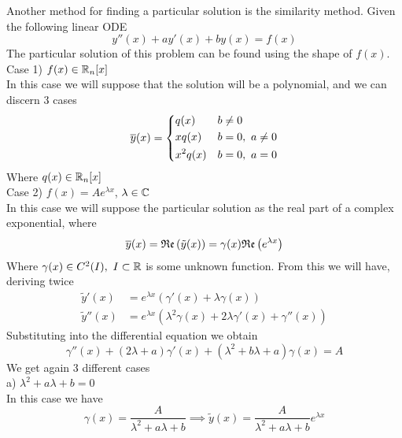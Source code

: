 \documentclass[../complete.tex]{subfiles}
\begin{document}
\begin{mtd}
	Another method for finding a particular solution is the similarity method. Given the following linear ODE
	\begin{equation*}
		y''(x)+ay'(x)+by(x)=f(x)
	\end{equation*}
	The particular solution of this problem can be found using the shape of $f(x)$.\\
	Case 1) $f(x)\in\mathbb{R}_n[x]$\\
	In this case we will suppose that the solution will be a polynomial, and we can discern 3 cases
	\begin{equation*}
		\overline{y}(x)=\begin{dcases}
			q(x)&b\ne0\\
			xq(x)&b=0,\ a\ne0\\
			x^2q(x)&b=0,\ a=0
		\end{dcases}
	\end{equation*}
	Where $q(x)\in\mathbb{R}_n[x]$\\
	Case 2) $f(x)=Ae^{\lambda x}$, $\lambda\in\mathbb{C}$\\
	In this case we will suppose the particular solution as the real part of a complex exponential, where
	\begin{equation*}
		\overline{y}(x)=\mathfrak{Re}\left( \tilde{y}(x) \right)=\gamma(x)\mathfrak{Re}\left( e^{\lambda x} \right)
	\end{equation*}
	Where $\gamma(x)\in C^2(I),\ I\subset\mathbb{R}$ is some unknown function. From this we will have, deriving twice
	\begin{equation*}
		\begin{aligned}
			\tilde{y}'(x)&=e^{\lambda x}\left( \gamma'(x)+\lambda\gamma(x) \right)\\
			\tilde{y}''(x)&=e^{\lambda x}\left( \lambda^2\gamma(x)+2\lambda\gamma'(x)+\gamma''(x) \right)
		\end{aligned}
	\end{equation*}
	Substituting into the differential equation we obtain
	\begin{equation*}
		\gamma''(x)+(2\lambda+a)\gamma'(x)+(\lambda^2+b\lambda+a)\gamma(x)=A
	\end{equation*}
	We get again 3 different cases\\
	a) $\lambda^2+a\lambda+b=0$\\
	In this case we have
	\begin{equation*}
		\gamma(x)=\frac{A}{\lambda^2+a\lambda+b}\implies \tilde{y}(x)=\frac{A}{\lambda^2+a\lambda+b}e^{\lambda x}
	\end{equation*}

\end{mtd}
\end{document}
